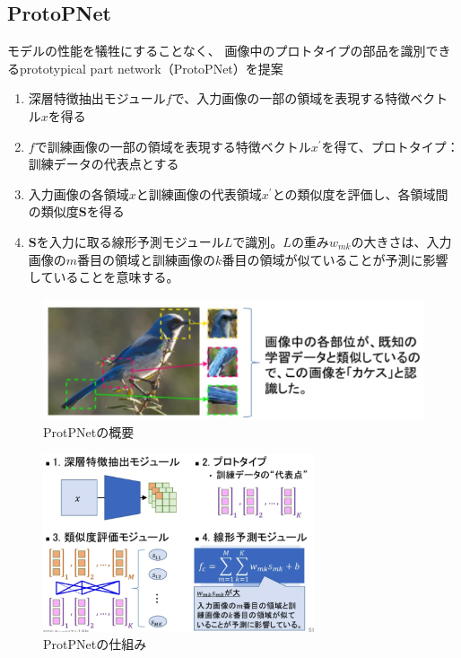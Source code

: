 \documentclass[a4paper,10pt]{ltjsarticle}
\newcommand{\bi}[1]{\ensuremath{\boldsymbol{#1}}}
\newcommand{\1}{\mbox{1}\hspace{-0.25em}\mbox{l}}
\theoremstyle{definition}
\begin{document}
    \subsection{ProtoPNet\cite{chen2019looks}}
    モデルの性能を犠牲にすることなく、
    画像中のプロトタイプの部品を識別できるprototypical part network（ProtoPNet）を提案
    \begin{enumerate}
        \item 深層特徴抽出モジュール$f$で、入力画像の一部の領域を表現する特徴ベクトル$x$を得る
        \item $f$で訓練画像の一部の領域を表現する特徴ベクトル$x^\prime$を得て、プロトタイプ：訓練データの代表点とする
        \item 入力画像の各領域$x$と訓練画像の代表領域$x^\prime$との類似度を評価し、各領域間の類似度\bi{S}を得る
        \item \bi{S}を入力に取る線形予測モジュール$L$で識別。$L$の重み$w_{mk}$の大きさは、入力画像の$m$番目の領域と訓練画像の$k$番目の領域が似ていることが予測に影響していることを意味する。
    \end{enumerate}
    \begin{figure}[H]
        \centering
        \includegraphics[width=120mm]{fig/protopnet}
        \caption{ProtPNetの概要}
    \end{figure}
    \begin{figure}[H]
        \centering
        \includegraphics[width=80mm]{fig/protop_2}
        \caption{ProtPNetの仕組み}
    \end{figure}



    
    
\end{document}
